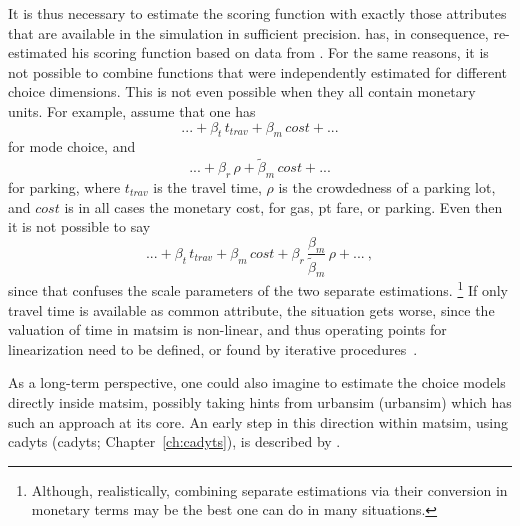 It is thus necessary to estimate the scoring function with exactly those attributes that are available in the simulation in sufficient precision.
%
\citet[][]{Kickhoefer_MastersThesis_2009} has, in consequence, re-estimated his scoring function based on data from \citet[][]{VrticEtc2008ReisekostenSVIBericht}. 
%
For the same reasons, it is not possible to combine functions that were independently estimated for different choice dimensions.  This is not even possible when they all contain monetary units.  For example, assume that one has
\[
... + \beta_{t} \, t_{trav} + \beta_{m} \, cost + ...
\]
for mode choice, and
\[
... + \beta_r \, \rho + \tilde\beta_{m} \, cost + ...
\]
for parking, where $t_{trav}$ is the travel time, $\rho$ is the crowdedness of a parking lot, and $cost$ is in all cases the monetary cost, \eg for gas, \gls{pt} fare, or parking.  Even then it is not possible to say
\[
... + \beta_{t} \, t_{trav} + \beta_{m} \, cost 
%
+ \beta_r \, \frac{\beta_m}{\tilde\beta_m} \, \rho + ... \ ,
\]
since that confuses the scale parameters of the two separate estimations.%
\footnote{%
%
Although, realistically, combining separate estimations via their conversion in monetary terms may be the best one can do in many situations.
%
} If only travel time is available as common attribute, the situation gets worse, since the valuation of time in \gls{matsim} is non-linear, and thus operating points for linearization need to be defined, or found by iterative procedures~\citep[][p.75ff]{Horni_PhDThesis_2013}.

As a long-term perspective, one could also imagine to estimate the choice models directly inside \gls{matsim}, possibly taking hints from \acrshort{urbansim} (\acrlong{urbansim}) which has such an approach at its core.  An early step in this direction within \gls{matsim}, using \acrshort{cadyts} (\acrlong{cadyts}; Chapter~\ref{ch:cadyts}), is described by \citet{FloetteroedChenNagel2012ChoiceModelRefinement}.


